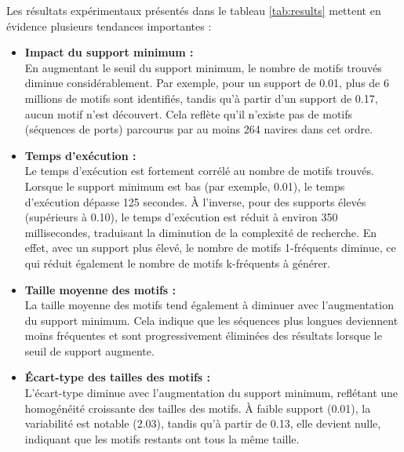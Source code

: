 \documentclass[a4paper,12pt]{article}
\begin{document}
Les résultats expérimentaux présentés dans le tableau \ref{tab:results} mettent en évidence plusieurs tendances importantes :  
\vspace{0.2cm}
\begin{itemize}
    \item \textbf{Impact du support minimum :\\}  
    En augmentant le seuil du support minimum, le nombre de motifs trouvés diminue considérablement. Par exemple, pour un support de 0.01, plus de 6 millions de motifs sont identifiés, tandis qu'à partir d'un support de 0.17, aucun motif n'est découvert. Cela reflète qu'il n'existe pas de motifs (séquences de ports) parcourus par au moins 264 navires dans cet ordre.  
    \vspace{0.3cm}
    \item \textbf{Temps d'exécution :\\}  
    Le temps d'exécution est fortement corrélé au nombre de motifs trouvés. Lorsque le support minimum est bas (par exemple, 0.01), le temps d'exécution dépasse 125 secondes. À l'inverse, pour des supports élevés (supérieurs à 0.10), le temps d'exécution est réduit à environ 350 millisecondes, traduisant la diminution de la complexité de recherche. En effet, avec un support plus élevé, le nombre de motifs 1-fréquents diminue, ce qui réduit également le nombre de motifs k-fréquents à générer.  
    \vspace{0.3cm}
    \item \textbf{Taille moyenne des motifs :\\}  
    La taille moyenne des motifs tend également à diminuer avec l'augmentation du support minimum. Cela indique que les séquences plus longues deviennent moins fréquentes et sont progressivement éliminées des résultats lorsque le seuil de support augmente. 
    \vspace{0.3cm}
    \item \textbf{Écart-type des tailles des motifs :\\} L’écart-type diminue avec l’augmentation du support minimum, reflétant une homogénéité croissante des tailles des motifs. À faible support (0.01), la variabilité est notable (2.03), tandis qu’à partir de 0.13, elle devient nulle, indiquant que les motifs restants ont tous la même taille.

\end{itemize}


\vspace{0.5cm}
\end{document}
